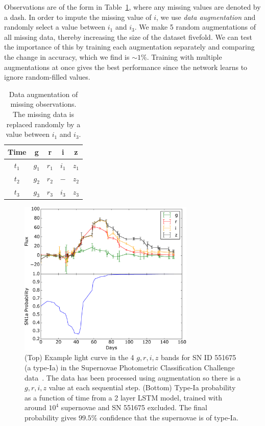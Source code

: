 \documentclass[twocolumn]{aastex61}
\begin{document}
Observations are of the form in Table~\ref{tab:augment}, where any missing values are denoted by a dash. In order to impute the missing value of $i$, we use {\em data augmentation} and randomly select a value between $i_1$ and $i_3$. We make 5 random augmentations of all missing data, thereby increasing the size of the dataset fivefold. We can test the importance of this by training each augmentation separately and comparing the change in accuracy, which we find is $\sim 1\%$. Training with multiple augmentations at once gives the best performance since the network learns to ignore random-filled values.

\begin{table}[htdp]
\begin{center}
\begin{tabular}{|c|c|c|c|c|}\hline  
 Time&g&r&i&z\\\hline\hline 
$t_1$&$g_1$&$r_1$&$i_1$&$z_1$\\\hline 
$t_2$&$g_2$&$r_2$&$-$&$z_2$\\\hline 
$t_3$&$g_3$&$r_3$&$i_3$& $z_3$\\\hline 
 \end{tabular}
\end{center}
\caption{\label{tab:augment} Data augmentation of missing observations. The missing data is replaced randomly by a value between $i_1$ and $i_3$.}
\end{table}%

\begin{figure}
\centering
\includegraphics[width=84mm, angle=0]{f3.pdf}
\caption{\label{fig:lightcurve} (Top) Example light curve in the 4 $g,r,i,z$ bands for SN ID 551675 (a type-Ia) in the Supernovae Photometric Classification Challenge data~\cite{Kessler:2010wk}. The data has been processed using augmentation so there is a $g,r,i,z$ value at each sequential step. (Bottom) Type-Ia probability as a function of time from a 2 layer LSTM model, trained with around $10^4$ supernovae and SN 551675 excluded. The final probability gives $99.5\%$ confidence that the supernovae is of type-Ia. 
 }
\end{figure}
\end{document}
